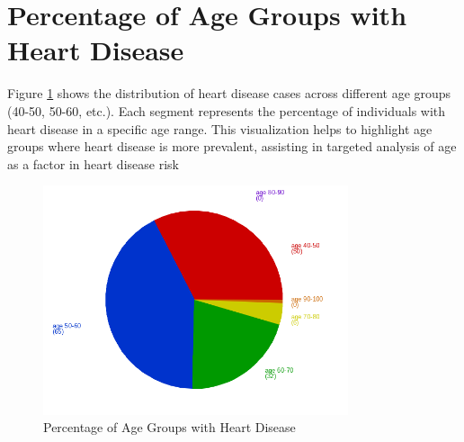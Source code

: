 \documentclass{article}
\begin{document}
	\section{Percentage of Age Groups with Heart Disease}
	Figure \ref{fig:fig4} shows the distribution of heart disease cases across different age groups (40-50, 50-60, etc.). Each segment represents the percentage of individuals with heart disease in a specific age range. This visualization helps to highlight age groups where heart disease is more prevalent, assisting in targeted analysis of age as a factor in heart disease risk
	\begin{figure}[h]
		\centering
		\includegraphics[width=0.8\textwidth]{../que4d/que4d.png}
		\caption{Percentage of Age Groups with Heart Disease}
		\label{fig:fig4}
	\end{figure}
	
\end{document}
